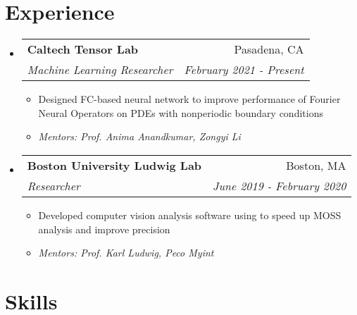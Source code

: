 \documentclass[letterpaper,11pt]{article}
\makeatletter
\newcommand{\resitem}[1]{\item #1 \vspace{-3pt}}
\newcommand{\ressubheading}[4]{
	\begin{tabular*}{7.0in}{l@{\extracolsep{\fill}}r}
			\textbf{#1} & #2 \\
			\textit{#3} & \textit{#4}
	\end{tabular*}\vspace{-6pt}
}
\makeatother
\begin{document}

\vspace{0pt}

\section{Experience}

\begin{itemize}[leftmargin=*]
	\item 
		\ressubheading{Caltech Tensor Lab}{Pasadena, CA}{Machine Learning Researcher}{February 2021 - Present}
			\begin{itemize}[leftmargin=*]
				\resitem{Designed FC-based neural network to improve performance of Fourier Neural Operators on PDEs with nonperiodic boundary conditions}
				\resitem{\textit{Mentors: Prof. Anima Anandkumar, Zongyi Li}}
			\end{itemize}

	\item 
		\ressubheading{Boston University Ludwig Lab}{Boston, MA}{Researcher}{June 2019 - February 2020}
			\begin{itemize}[leftmargin=*]
				\resitem{Developed computer vision analysis software using to speed up MOSS analysis and improve precision}
				\resitem{\textit{Mentors: Prof. Karl Ludwig, Peco Myint}}
			\end{itemize}
		
\end{itemize}


\section{Skills}
\end{document}
